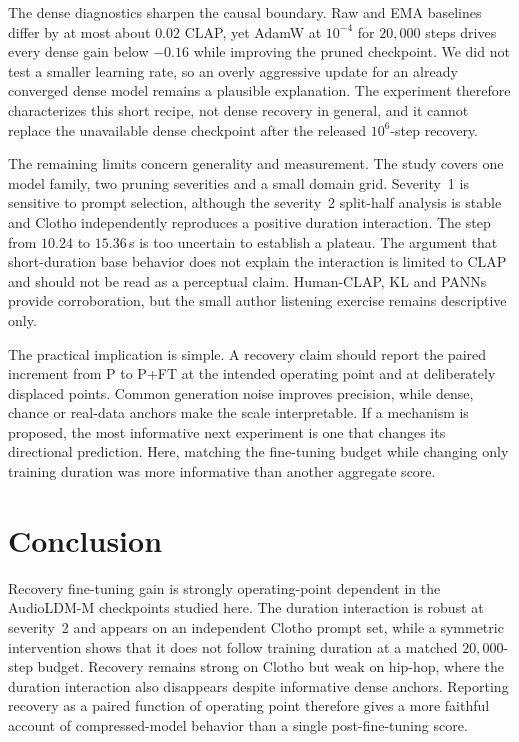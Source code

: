 \documentclass{article}
\newcommand{\PFT}{P{+}FT}
\begin{document}
The dense diagnostics sharpen the causal boundary. Raw and EMA baselines differ by at most about $0.02$ CLAP, yet AdamW at $10^{-4}$ for $20{,}000$ steps drives every dense gain below $-0.16$ while improving the pruned checkpoint. We did not test a smaller learning rate, so an overly aggressive update for an already converged dense model remains a plausible explanation. The experiment therefore characterizes this short recipe, not dense recovery in general, and it cannot replace the unavailable dense checkpoint after the released $10^{6}$-step recovery.

The remaining limits concern generality and measurement. The study covers one model family, two pruning severities and a small domain grid. Severity~1 is sensitive to prompt selection, although the severity~2 split-half analysis is stable and Clotho independently reproduces a positive duration interaction. The step from $10.24$ to $15.36$\,s is too uncertain to establish a plateau. The argument that short-duration base behavior does not explain the interaction is limited to CLAP and should not be read as a perceptual claim. Human-CLAP, KL and PANNs provide corroboration, but the small author listening exercise remains descriptive only.

The practical implication is simple. A recovery claim should report the paired increment from P to \PFT{} at the intended operating point and at deliberately displaced points. Common generation noise improves precision, while dense, chance or real-data anchors make the scale interpretable. If a mechanism is proposed, the most informative next experiment is one that changes its directional prediction. Here, matching the fine-tuning budget while changing only training duration was more informative than another aggregate score.

\section{Conclusion}
Recovery fine-tuning gain is strongly operating-point dependent in the AudioLDM-M checkpoints studied here. The duration interaction is robust at severity~2 and appears on an independent Clotho prompt set, while a symmetric intervention shows that it does not follow training duration at a matched $20{,}000$-step budget. Recovery remains strong on Clotho but weak on hip-hop, where the duration interaction also disappears despite informative dense anchors. Reporting recovery as a paired function of operating point therefore gives a more faithful account of compressed-model behavior than a single post-fine-tuning score.
\end{document}
